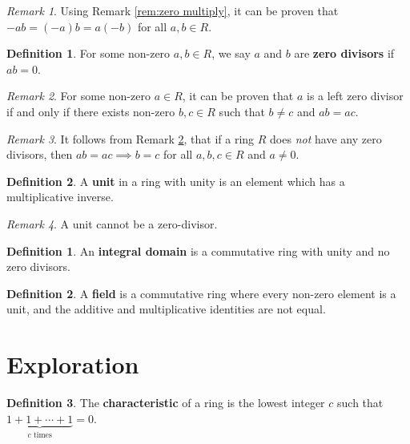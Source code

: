 \documentclass[parskip=half]{scrartcl}  %
\theoremstyle{definition}
\newtheorem{definition}{Definition}[section]
\newtheorem{subdefinition}{Definition}[definition]
\theoremstyle{plain}
\theoremstyle{remark}
\newtheorem{remark}{Remark}[definition]
\begin{document}
\begin{remark}
    Using Remark \ref{rem:zero multiply}, it can be proven that
    $-ab=(-a)b=a(-b)$ for all $a,b\in R$.
\end{remark}

\begin{subdefinition}
    For some non-zero $a,b\in R$, we say $a$ and $b$ are \textbf{zero divisors}
    if $ab=0$.
\end{subdefinition}

\begin{remark}
    \label{rem:zero divisor}
    For some non-zero $a\in R$, it can be proven that $a$ is a left zero
    divisor if and only if there exists non-zero $b,c\in R$ such that $b\neq c$
    and $ab=ac$.
\end{remark}

\begin{remark}
    It follows from Remark \ref{rem:zero divisor}, that if a ring $R$ does
    \textit{not} have any zero divisors, then $ab=ac\implies b=c$ for all
    $a,b,c\in R$ and $a\neq 0$.
\end{remark}

\begin{subdefinition}
    A \textbf{unit} in a ring with unity is an element which has a
    multiplicative inverse.
\end{subdefinition}

\begin{remark}
    A unit cannot be a zero-divisor.
\end{remark}

\begin{definition}
    An \textbf{integral domain} is a commutative ring with unity and no zero
    divisors.
\end{definition}

\begin{definition}
    A \textbf{field} is a commutative ring where every non-zero element is a
    unit, and the additive and multiplicative identities are not equal.
\end{definition}


\section{Exploration}


\begin{definition}
    The \textbf{characteristic} of a ring is the lowest integer $c$ such that
    $\underbrace{1+1+\cdots+1}_{c\text{ times}}=0$.
\end{definition}
\end{document}

